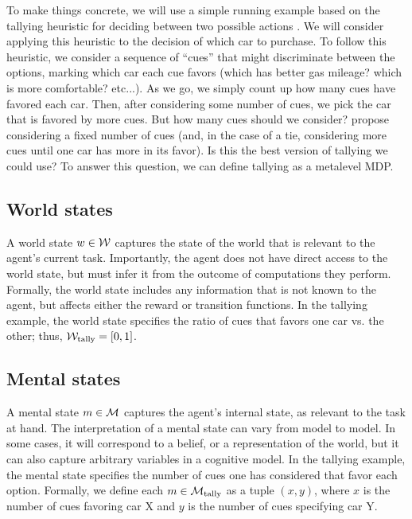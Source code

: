 To make things concrete, we will use a simple running example based on the tallying heuristic for deciding between two possible actions \citep{gigerenzer2011heuristic}. We will consider applying this heuristic to the decision of which car to purchase. To follow this heuristic, we consider a sequence of ``cues'' that might discriminate between the options, marking which car each cue favors (which has better gas mileage? which is more comfortable? etc...). As we go, we simply count up how many cues have favored each car. Then, after considering some number of cues, we pick the car that is favored by more cues. But how many cues should we consider? \citeauthor{gigerenzer2011heuristic} propose considering a fixed number of cues (and, in the case of a tie, considering more cues until one car has more in its favor). Is this the best version of tallying we could use? To answer this question, we can define tallying as a metalevel MDP.

\subsection{World states}
A world state $w \in \mathcal{W}$ captures the state of the world that is relevant to the agent's current task. Importantly, the agent does not have direct access to the world state, but must infer it from the outcome of computations they perform. Formally, the world state includes any information that is not known to the agent, but affects either the reward or transition functions. In the tallying example, the world state specifies the ratio of cues that favors one car vs. the other; thus, $\mathcal{W}_{\text{tally}} = [0, 1]$. 



\subsection{Mental states}

A mental state $m \in \mathcal{M}$ captures the agent's internal state, as relevant to the task at hand. The interpretation of a mental state can vary from model to model. In some cases, it will correspond to a belief, or a representation of the world, but it can also capture arbitrary variables in a cognitive model. In the tallying example, the mental state specifies the number of cues one has considered that favor each option. Formally, we define each $m \in \mathcal{M}_{\text{tally}}$ as a tuple $(x, y)$, where $x$ is the number of cues favoring car X and $y$ is the number of cues specifying car Y.

